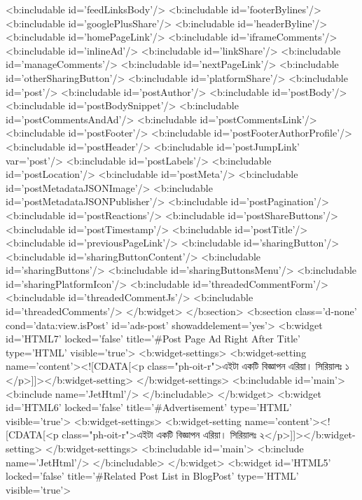 {{{{    <b:includable id='feedLinksBody'/>
    <b:includable id='footerBylines'/>
    <b:includable id='googlePlusShare'/>
    <b:includable id='headerByline'/>
    <b:includable id='homePageLink'/>
    <b:includable id='iframeComments'/>
    <b:includable id='inlineAd'/>
    <b:includable id='linkShare'/>
    <b:includable id='manageComments'/>
    <b:includable id='nextPageLink'/>
    <b:includable id='otherSharingButton'/>
    <b:includable id='platformShare'/>
    <b:includable id='post'/>
    <b:includable id='postAuthor'/>
    <b:includable id='postBody'/>
    <b:includable id='postBodySnippet'/>
    <b:includable id='postCommentsAndAd'/>
    <b:includable id='postCommentsLink'/>
    <b:includable id='postFooter'/>
    <b:includable id='postFooterAuthorProfile'/>
    <b:includable id='postHeader'/>
    <b:includable id='postJumpLink' var='post'/>
    <b:includable id='postLabels'/>
    <b:includable id='postLocation'/>
    <b:includable id='postMeta'/>
    <b:includable id='postMetadataJSONImage'/>
    <b:includable id='postMetadataJSONPublisher'/>
    <b:includable id='postPagination'/>
    <b:includable id='postReactions'/>
    <b:includable id='postShareButtons'/>
    <b:includable id='postTimestamp'/>
    <b:includable id='postTitle'/>
    <b:includable id='previousPageLink'/>
    <b:includable id='sharingButton'/>
    <b:includable id='sharingButtonContent'/>
    <b:includable id='sharingButtons'/>
    <b:includable id='sharingButtonsMenu'/>
    <b:includable id='sharingPlatformIcon'/>
    <b:includable id='threadedCommentForm'/>
    <b:includable id='threadedCommentJs'/>
    <b:includable id='threadedComments'/>
  </b:widget>
</b:section>
<b:section class='d-none' cond='data:view.isPost' id='ads-post' showaddelement='yes'>
  <b:widget id='HTML7' locked='false' title='#Post Page Ad Right After Title' type='HTML' visible='true'>
    <b:widget-settings>
      <b:widget-setting name='content'><![CDATA[<p class="ph-oit-r">এইটা একটি বিজ্ঞাপন এরিয়া। সিরিয়ালঃ ১ </p>]]></b:widget-setting>
    </b:widget-settings>
    <b:includable id='main'>
      <b:include name='JetHtml'/>
    </b:includable>
  </b:widget>
  <b:widget id='HTML6' locked='false' title='#Advertisement' type='HTML' visible='true'>
    <b:widget-settings>
      <b:widget-setting name='content'><![CDATA[<p class="ph-oit-r">এইটা একটি বিজ্ঞাপন এরিয়া। সিরিয়ালঃ ২</p>]]></b:widget-setting>
    </b:widget-settings>
    <b:includable id='main'>
      <b:include name='JetHtml'/>
    </b:includable>
  </b:widget>
  <b:widget id='HTML5' locked='false' title='#Related Post List in BlogPost' type='HTML' visible='true'>
}}}}
